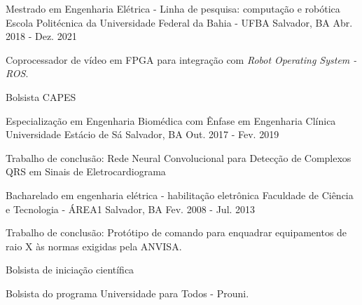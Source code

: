 

\begin{cventries}
  

  \cventry
    {Mestrado em Engenharia Elétrica - Linha de pesquisa: computação e robótica} %
    {Escola Politécnica da Universidade Federal da Bahia - UFBA} %
    {Salvador, BA} %
    {Abr. 2018 - Dez. 2021} %
    {
      \begin{cvitems} %
        \item {Coprocessador de vídeo em FPGA para integração com \textit{Robot Operating System - ROS}.}
        \item {Bolsista CAPES}
      \end{cvitems}
    }


  \cventry
    {Especialização em Engenharia Biomédica com Ênfase em Engenharia Clínica} %
    {Universidade Estácio de Sá} %
    {Salvador, BA} %
    {Out. 2017 - Fev. 2019} %
    {
      \begin{cvitems} %
        \item {Trabalho de conclusão: Rede Neural Convolucional para Detecção de Complexos QRS em Sinais de Eletrocardiograma}
      \end{cvitems}
    }


  \cventry
    {Bacharelado em engenharia elétrica - habilitação eletrônica} %
    {Faculdade de Ciência e Tecnologia - ÁREA1} %
    {Salvador, BA} %
    {Fev. 2008 - Jul. 2013} %
    {
      \begin{cvitems} %
        \item {Trabalho de conclusão: Protótipo de comando para enquadrar equipamentos de raio X às normas exigidas pela ANVISA.}
        \item {Bolsista de iniciação científica}
        \item {Bolsista do programa Universidade para Todos - Prouni.}
      \end{cvitems}
    }


\end{cventries}
